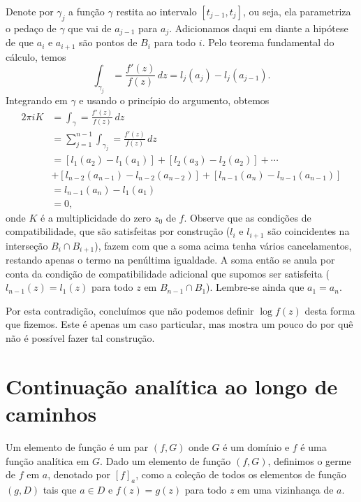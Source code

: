 Denote por $\gamma_j$ a função $\gamma$ restita ao intervalo $[t_{j-1},t_j]$, ou seja, ela
parametriza o pedaço de $\gamma$ que vai de $a_{j-1}$ para $a_j$. Adicionamos daqui em diante 
a hipótese de que $a_i$ e $a_{i+1}$ são pontos de $B_i$ para todo $i$. Pelo teorema fundamental
do cálculo, temos
%
\begin{equation*}
    \int_{\gamma_j} = \frac{f'(z)}{f(z)}\, dz = l_j(a_j) - l_j(a_{j-1}).  
\end{equation*}
%
Integrando em $\gamma$ e usando o princípio do argumento, obtemos
\begin{align*}
    2 \pi i K &= \int_{\gamma} = \frac{f'(z)}{f(z)}\, dz \\
    &= \sum_{j=1}^{n-1}\int_{\gamma_j} = \frac{f'(z)}{f(z)}\, dz \\
    &= [l_1(a_2) - l_1(a_1)] + [l_2(a_3) - l_2(a_2)] + \cdots \\
    &+ [l_{n-2}(a_{n-1}) - l_{n-2}(a_{n-2})] + [l_{n-1}(a_{n}) - l_{n-1}(a_{n-1})] \\
    &= l_{n-1}(a_n) - l_1(a_1)\\
    &= 0,
\end{align*}
onde $K$ é a multiplicidade do zero $z_0$ de $f$. Observe que as condições de compatibilidade,
que são satisfeitas por construção ($l_i$ e $l_{i+1}$ são coincidentes na interseção 
$B_i \cap B_{i+1}$), fazem com que a soma acima tenha vários cancelamentos, restando apenas o
termo na penúltima igualdade. A soma então se anula por conta da condição de compatibilidade
adicional que supomos ser satisfeita ($l_{n-1}(z) = l_1(z)$ para todo $z$ em 
$B_{n-1} \cap B_1$). Lembre-se ainda que $a_1 = a_n$.

Por esta contradição, concluímos que não podemos definir $\log f(z)$ desta forma que fizemos.
Este é apenas um caso particular, mas mostra um pouco do por quê não é possível fazer tal
construção.

\section{Continuação analítica ao longo de caminhos}


    \begin{definicao}
        \label{def-elemento-funcao}
        Um elemento de função é um par $(f, G)$ onde $G$ é um domínio e $f$
        é uma função analítica em $G$. Dado um elemento de função $(f,G)$, 
        definimos o germe de $f$ em $a$, denotado por $[f]_a$, 
        como a coleção de todos os elementos de função $(g,D)$ tais que 
        $a\in D$ e $f(z) = g(z)$ para todo $z$ em uma vizinhança de $a$.
    \end{definicao}


